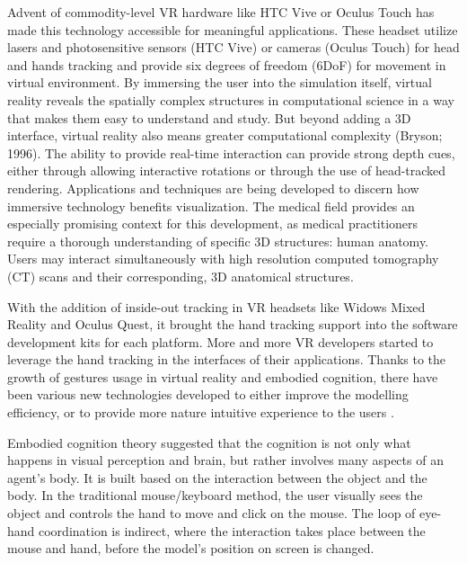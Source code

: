 Advent of commodity-level VR hardware like HTC Vive or Oculus Touch has made this technology accessible for meaningful applications. These headset utilize lasers and photosensitive sensors (HTC Vive) or cameras (Oculus Touch) for head and hands tracking and provide six degrees of freedom (6DoF) for movement in virtual environment. By immersing the user into the simulation itself, virtual reality reveals the spatially complex structures in computational science in a way that makes them easy to understand and study. But beyond adding a 3D interface, virtual reality also means greater computational complexity (Bryson; 1996). The ability to provide real-time interaction can provide strong depth cues, either through allowing interactive rotations or through the use of head-tracked rendering. Applications and techniques are being developed to discern how immersive technology benefits visualization. The medical field provides an especially promising context for this development, as medical practitioners require a thorough understanding of specific 3D structures: human anatomy. Users may interact simultaneously with high resolution computed tomography (CT) scans and their corresponding, 3D anatomical structures.


With the addition of inside-out tracking in VR headsets like Widows Mixed Reality and Oculus Quest, it brought the hand tracking support into the software development kits for each platform. More and more VR developers started to leverage the hand tracking in the interfaces of their applications. Thanks to the growth of gestures usage in virtual reality and embodied cognition, there have been various new technologies developed to either improve the modelling efficiency, or to provide more nature intuitive experience to the users \citep{dangetiComparingBarehandinairGesture2016}.

Embodied cognition theory suggested that the cognition is not only what happens in visual perception and brain, but rather involves many aspects of an agent’s body. It is built based on the interaction between the object and the body. In the traditional mouse/keyboard method, the user visually sees the object and controls the hand to move and click on the mouse. The loop of eye-hand coordination is indirect, where the interaction takes place between the mouse and hand, before the model’s position on screen is changed.

